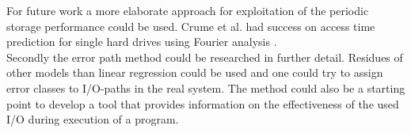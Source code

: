 \documentclass{superfri}
\begin{document}
For future work a more elaborate approach for exploitation of the periodic storage performance could be used. 
Crume et al. had success on access time prediction for single hard drives using Fourier analysis \cite{Crume:2013:FML:2538542.2538561}.\\
Secondly the error path method could be researched in further detail.
Residues of other models than linear regression could be used and one could try to assign error classes to I/O-paths in the real system.
The method could also be a starting point to develop a tool that provides information on the effectiveness of the used I/O during execution of a program.

\openaccess



\end{document}
